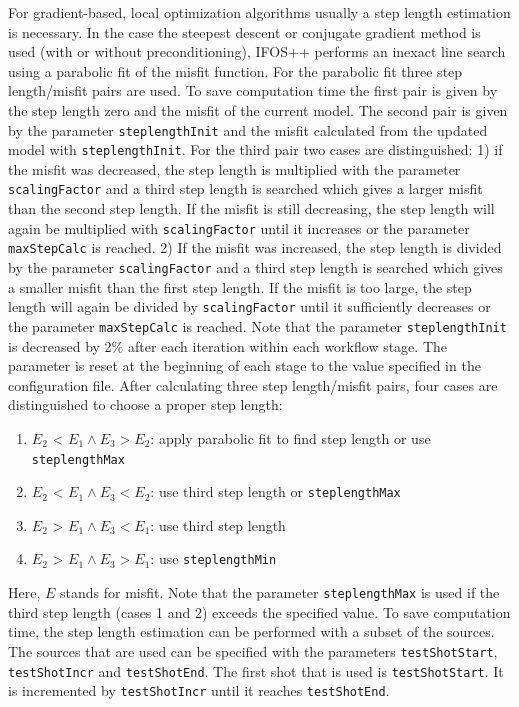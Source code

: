 \documentclass[pdftex,a4paper,parskip,listof=totoc,bibliography=totoc,onehalfspacing,12pt]{scrreprt}
\begin{document}
For gradient-based, local optimization algorithms usually a step length estimation is necessary. In the case the steepest descent or conjugate gradient method is used (with or without preconditioning), IFOS++ performs an inexact line search using a parabolic fit of the misfit function. For the parabolic fit three step length/misfit pairs are used. To save computation time the first pair is given by the step length zero and the misfit of the current model. The second pair is given by the parameter \verb+steplengthInit+ and the misfit calculated from the updated model with \verb+steplengthInit+. For the third pair two cases are distinguished: 1) if the misfit was decreased, the step length is multiplied with the parameter \verb+scalingFactor+ and a third step length is searched which gives a larger misfit than the second step length. If the misfit is still decreasing, the step length will again be multiplied with \verb+scalingFactor+ until it increases or the parameter \verb+maxStepCalc+ is reached. 2) If the misfit was increased, the step length is divided by the parameter \verb+scalingFactor+ and a third step length is searched which gives a smaller misfit than the first step length. If the misfit is too large, the step length will again be divided by \verb+scalingFactor+ until it sufficiently decreases or the parameter \verb+maxStepCalc+ is reached.
Note that the parameter \verb+steplengthInit+ is decreased by 2\% after each iteration within each workflow stage. The parameter is reset at the beginning of each stage to the value specified in the configuration file.
After calculating three step length/misfit pairs, four cases are distinguished to choose a proper step length:

\begin{enumerate}
 \item $E_2$ < $E_1 \land E_3 > E_2$: apply parabolic fit to find step length or use \verb+steplengthMax+ 
 \item $E_2$ < $E_1 \land E_3 < E_2$: use third step length or \verb+steplengthMax+
 \item $E_2$ > $E_1 \land E_3 < E_1$: use third step length 
 \item $E_2$ > $E_1 \land E_3 > E_1$: use \verb+steplengthMin+
\end{enumerate}

Here, $E$ stands for misfit. Note that the parameter \verb+steplengthMax+ is used if the third step length (cases 1 and 2) exceeds the specified value.
To save computation time, the step length estimation can be performed with a subset of the sources. The sources that are used can be specified with the parameters \verb+testShotStart+, \verb+testShotIncr+ and \verb+testShotEnd+. The first shot that is used is \verb+testShotStart+. It is incremented by \verb+testShotIncr+ until it reaches \verb+testShotEnd+.
\end{document}
